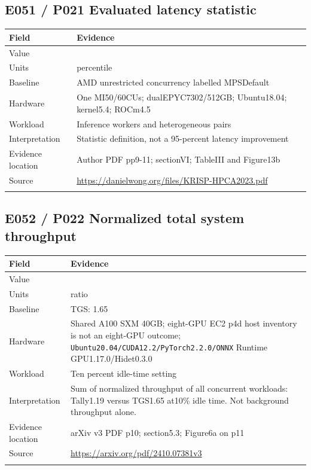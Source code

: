 \subsection*{E051 / P021 Evaluated latency statistic}

\begin{longtable}{>{\raggedright\arraybackslash}p{}>{\raggedright\arraybackslash}p{}}
\toprule
\textbf{Field} & \textbf{Evidence}\\\midrule\endhead
Value & 95\\\addlinespace
Units & percentile\\\addlinespace
Baseline & AMD unrestricted concurrency labelled MPSDefault\\\addlinespace
Hardware & One MI50/60CUs; dualEPYC7302/512GB; Ubuntu18.04; kernel5.4; ROCm4.5\\\addlinespace
Workload & Inference workers and heterogeneous pairs\\\addlinespace
Interpretation & Statistic definition, not a 95-percent latency improvement\\\addlinespace
Evidence location & Author PDF pp9-11; sectionVI; TableIII and Figure13b\\\addlinespace
Source & \url{https://danielwong.org/files/KRISP-HPCA2023.pdf}\\\addlinespace
\bottomrule\end{longtable}

\subsection*{E052 / P022 Normalized total system throughput}

\begin{longtable}{>{\raggedright\arraybackslash}p{}>{\raggedright\arraybackslash}p{}}
\toprule
\textbf{Field} & \textbf{Evidence}\\\midrule\endhead
Value & 1.19\\\addlinespace
Units & ratio\\\addlinespace
Baseline & TGS: 1.65\\\addlinespace
Hardware & Shared A100 SXM 40GB; eight-GPU EC2 p4d host inventory is not an eight-GPU outcome; \nolinkurl{Ubuntu20.04/CUDA12.2/PyTorch2.2.0/ONNX} Runtime GPU1.17.0/Hidet0.3.0\\\addlinespace
Workload & Ten percent idle-time setting\\\addlinespace
Interpretation & Sum of normalized throughput of all concurrent workloads: Tally1.19 versus TGS1.65 at10\% idle time. Not background throughput alone.\\\addlinespace
Evidence location & arXiv v3 PDF p10; section5.3; Figure6a on p11\\\addlinespace
Source & \url{https://arxiv.org/pdf/2410.07381v3}\\\addlinespace
\bottomrule\end{longtable}

